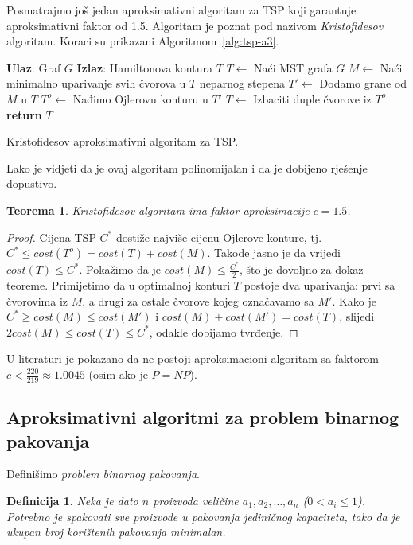 \documentclass[b5paper, utf8, 11pt, colorlinks]{book}
\newtheorem{definition}{Definicija}[chapter]
\newtheorem{thm}{Teorema}[chapter]
\theoremstyle{definition}
\begin{document}
Posmatrajmo još jedan aproksimativni algoritam za TSP koji garantuje aproksimativni faktor od 1.5. Algoritam je poznat pod nazivom \emph{Kristofidesov} algoritam.
Koraci su prikazani Algoritmom~\ref{alg:tsp-a3}.

\begin{algorithm}[H] 

	\begin{algorithmic}[1]
		\STATE \textbf{Ulaz}: Graf $G$
		\STATE \textbf{Izlaz}: Hamiltonova kontura $T$ 
		\STATE $T \gets$ Naći MST grafa $G$
		\STATE $M \gets$ Naći minimalno uparivanje svih čvorova u $T$ neparnog stepena
		\STATE $T' \gets$ Dodamo grane od $M$ u $T$
		\STATE $T^o\gets$ Nađimo Ojlerovu konturu u $T'$
		\STATE $T \gets$ Izbaciti duple čvorove iz $T^o$
		\STATE \textbf{return} $T$
	\end{algorithmic}	
    \caption{Kristofidesov aproksimativni algoritam za TSP.}
    \label{alg:tsp-a3}
\end{algorithm}
  Lako je vidjeti da je ovaj algoritam polinomijalan i da je dobijeno rješenje dopustivo. 
  \begin{thm}
  	  Kristofidesov algoritam ima faktor aproksimacije $c=1.5$.
  \end{thm}
\begin{proof}
  Cijena TSP $C^*$ dostiže najviše cijenu Ojlerove konture, tj.  $C^*\leq cost(T^o) = cost(T) + cost(M)$.  Takođe jasno je da vrijedi $cost(T) \leq C^*$. Pokažimo da je $cost(M) \leq  \frac{C^*}{2}$, što je dovoljno za dokaz teoreme. Primijetimo da u optimalnoj konturi $T$ postoje dva uparivanja: prvi sa čvorovima iz $M$, a drugi za ostale čvorove kojeg označavamo sa $M'$. 
  Kako je $C^* \geq cost(M) \leq cost(M')$ i $cost(M) + cost(M') = cost(T)$, slijedi 
  $2 cost(M) \leq cost(T) \leq C^*$, odakle dobijamo tvrđenje.  
\end{proof} 

U literaturi je pokazano da ne postoji  aproksimacioni algoritam sa faktorom  $c < \frac{220}{219} \approx 1.0045$ (osim ako je $P=NP$). 
 
 
 \subsection{Aproksimativni algoritmi za problem binarnog pakovanja}\label{sec:binpack}

Definišimo \emph{problem binarnog pakovanja}.  
\begin{definition}
    Neka je dato $n$ proizvoda veličine $a_1,a_2,\ldots,a_n$ ($0<a_i \leq 1$). Potrebno je spakovati sve proizvode u pakovanja  jediničnog kapaciteta, tako da je ukupan broj korištenih pakovanja  minimalan.  
\end{definition}
\end{document}
